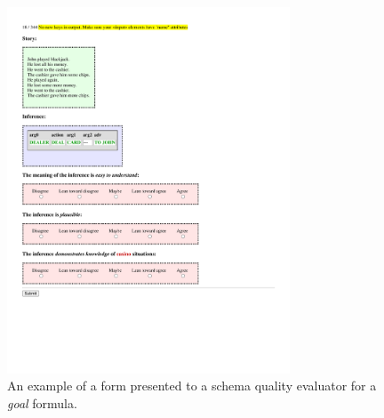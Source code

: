 \begin{figure}
    \centering
    \includegraphics[width=0.75\textwidth]{CH5_eval/step_inf.pdf}
    \caption{An example of a form presented to a schema quality evaluator for a \textit{goal} formula.}
    \label{fig:step_inf_eval}
\end{figure}